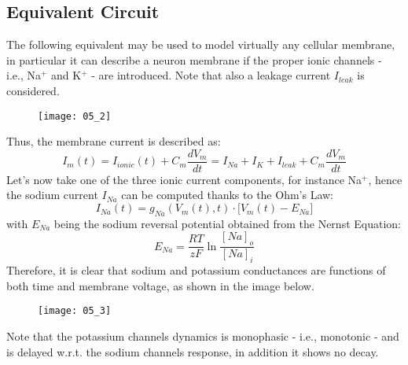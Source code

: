 \subsection{Equivalent Circuit}
The following equivalent may be used to model virtually any cellular membrane, in particular it
can describe a neuron membrane if the proper ionic channels - i.e., Na\({}^{+}\) and K\({}^{+}\) -
are introduced. Note that also a leakage current \(I_{leak}\) is considered.
\begin{figure}[H]
    \texttt{[image: 05\_2]}
    \centering
\end{figure}
Thus, the membrane current is described as:
\begin{equation*}
    I_{m}(t)=I_{ionic}(t)+C_{m}\frac{dV_{m}}{dt}=I_{Na}+I_{K}+I_{leak}+C_{m}\frac{dV_{m}}{dt}
\end{equation*}
Let's now take one of the three ionic current components, for instance Na\({}^{+}\), hence
the sodium current \(I_{Na}\) can be computed thanks to the Ohm's Law:
\begin{equation*}
    I_{Na}(t)=g_{Na}(V_{m}(t),t)\cdot{\bigl[V_{m}(t)-E_{Na}\bigr]}
\end{equation*}
with \(E_{Na}\) being the sodium reversal potential obtained from the Nernst Equation:
\begin{equation*}
    E_{Na}=\frac{RT}{zF}\ln{\frac{[Na]_{o}}{[Na]_{i}}}
\end{equation*}
Therefore, it is clear that sodium and potassium conductances are functions of
both time and membrane voltage, as shown in the image below.
\begin{figure}[H]
    \texttt{[image: 05\_3]}
    \centering
\end{figure}
Note that the potassium channels dynamics is monophasic - i.e., monotonic - and is delayed
w.r.t. the sodium channels response, in addition it shows no decay.

